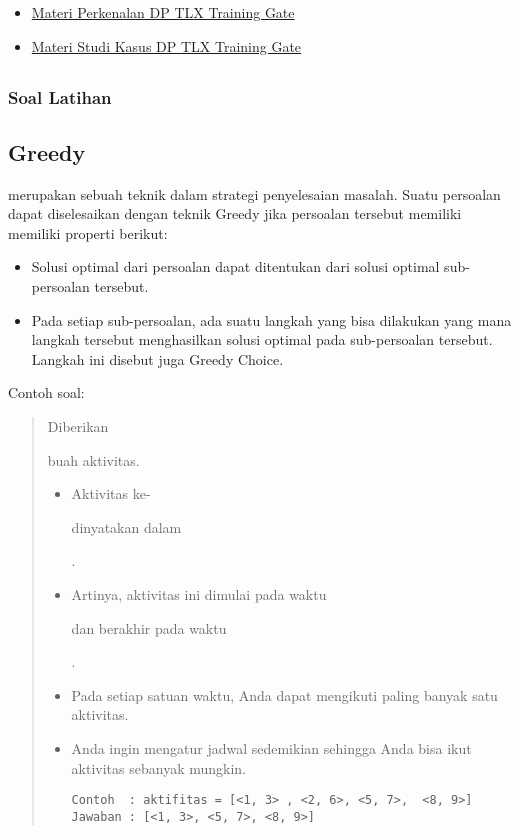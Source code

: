 \documentclass[]{article}
\providecommand{\tightlist}{%
  \setlength{\itemsep}{0pt}\setlength{\parskip}{0pt}}
\begin{document}
\begin{itemize}
\tightlist
\item
  \href{https://training.ia-toki.org/training/curriculums/1/courses/11/chapters/55/lessons/23/}{Materi
  Perkenalan DP TLX Training Gate}
\item
  \href{https://training.ia-toki.org/training/curriculums/1/courses/11/chapters/55/lessons/24/}{Materi
  Studi Kasus DP TLX Training Gate}
\end{itemize}

\subsection{}\label{rekomandasi-soal-soal-latihan}

\subsubsection{Soal Latihan}\label{soal-latihan-2}

\subsection{Greedy}\label{greedy}

merupakan sebuah teknik dalam strategi penyelesaian masalah. Suatu
persoalan dapat diselesaikan dengan teknik Greedy jika persoalan
tersebut memiliki memiliki properti berikut:

\begin{itemize}
\tightlist
\item
  Solusi optimal dari persoalan dapat ditentukan dari solusi optimal
  sub-persoalan tersebut.
\item
  Pada setiap sub-persoalan, ada suatu langkah yang bisa dilakukan yang
  mana langkah tersebut menghasilkan solusi optimal pada sub-persoalan
  tersebut. Langkah ini disebut juga Greedy Choice.
\end{itemize}

Contoh soal:

\begin{quote}
Diberikan

buah aktivitas.

\begin{itemize}
\tightlist
\item
  Aktivitas ke-

  dinyatakan dalam

  .
\item
  Artinya, aktivitas ini dimulai pada waktu

  dan berakhir pada waktu

  .
\item
  Pada setiap satuan waktu, Anda dapat mengikuti paling banyak satu
  aktivitas.
\item
  Anda ingin mengatur jadwal sedemikian sehingga Anda bisa ikut
  aktivitas sebanyak mungkin.

\begin{verbatim}
Contoh  : aktifitas = [<1, 3> , <2, 6>, <5, 7>,  <8, 9>]
Jawaban : [<1, 3>, <5, 7>, <8, 9>]
\end{verbatim}
\end{itemize}
\end{quote}
\end{document}
